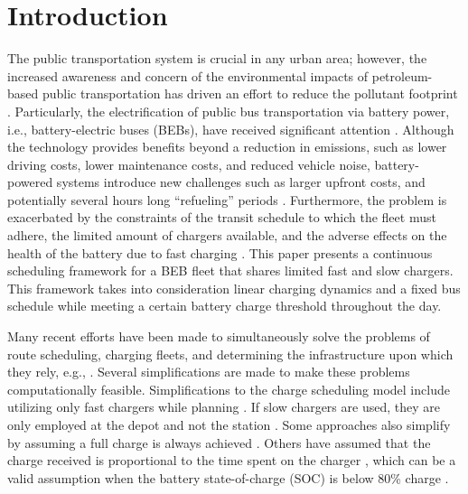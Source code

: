 \documentclass[utf8]{FrontiersinHarvard}
\let\cite\citep                                       %
\begin{document}
\section{Introduction}
\label{sec:introduction}
The public transportation system is crucial in any urban area; however, the increased awareness and concern of the
environmental impacts of petroleum-based public transportation has driven an effort to reduce the pollutant footprint
\cite{de-2014-simul-elect,xylia-2018-role-charg,guida-2017-zeeus-repor-europ,li-2016-batter-elect}. Particularly,
the electrification of public bus transportation via battery power, i.e., battery-electric buses (BEBs), have received
significant attention \cite{li-2016-batter-elect}. Although the technology provides benefits beyond a reduction in
emissions, such as lower driving costs, lower maintenance costs, and reduced vehicle noise, battery-powered systems
introduce new challenges such as larger upfront costs, and potentially several hours long ``refueling'' periods
\cite{xylia-2018-role-charg,li-2016-batter-elect}. Furthermore, the problem is exacerbated by the constraints of the
transit schedule to which the fleet must adhere, the limited amount of chargers available, and the adverse effects on
the health of the battery due to fast charging \cite{lutsey-2019-updat-elect}. This paper presents a continuous
scheduling framework for a BEB fleet that shares limited fast and slow chargers. This framework takes into consideration
linear charging dynamics and a fixed bus schedule while meeting a certain battery charge threshold throughout the day.

Many recent efforts have been made to simultaneously solve the problems of route scheduling, charging fleets, and
determining the infrastructure upon which they rely, e.g., \cite{wei-2018-optim-spatio,sebastiani-2016-evaluat-elect,hoke-2014-accoun-lithium,wang-2017-elect-vehic}. Several simplifications are made to make these problems
computationally feasible. Simplifications to the charge scheduling model include utilizing only fast chargers while
planning \cite{wei-2018-optim-spatio,sebastiani-2016-evaluat-elect,wang-2017-optim-rechar,zhou-2020-bi-objec,yang-2018-charg-sched,wang-2017-elect-vehic,qin-2016-numer-analy,liu-2020-batter-elect}. If slow chargers are used,
they are only employed at the depot and not the station \cite{he-2020-optim-charg,tang-2019-robus-sched}. Some
approaches also simplify by assuming a full charge is always achieved
\cite{wei-2018-optim-spatio,wang-2017-elect-vehic,zhou-2020-bi-objec,wang-2017-optim-rechar}. Others have assumed
that the charge received is proportional to the time spent on the charger
\cite{liu-2020-batter-elect,yang-2018-charg-sched}, which can be a valid assumption when the battery state-of-charge
(SOC) is below 80\% charge \cite{liu-2020-batter-elect}.
\end{document}
